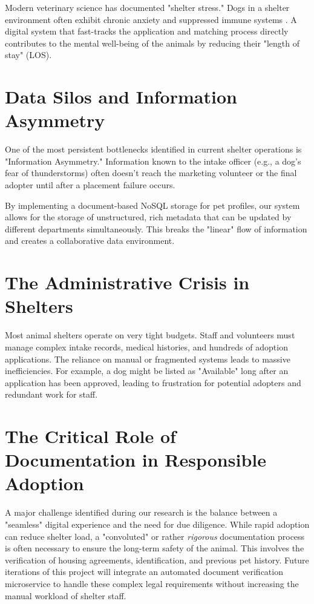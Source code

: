 Modern veterinary science has documented "shelter stress." Dogs in a shelter environment often exhibit chronic anxiety and suppressed immune systems \cite{shelter_stress_2022}. A digital system that fast-tracks the application and matching process directly contributes to the mental well-being of the animals by reducing their "length of stay" (LOS).

\section{Data Silos and Information Asymmetry}
One of the most persistent bottlenecks identified in current shelter operations is "Information Asymmetry." Information known to the intake officer (e.g., a dog's fear of thunderstorms) often doesn't reach the marketing volunteer or the final adopter until after a placement failure occurs.

By implementing a document-based NoSQL storage for pet profiles, our system allows for the storage of unstructured, rich metadata that can be updated by different departments simultaneously. This breaks the "linear" flow of information and creates a collaborative data environment.

\section{The Administrative Crisis in Shelters}

Most animal shelters operate on very tight budgets. Staff and volunteers must manage complex intake records, medical histories, and hundreds of adoption applications. The reliance on manual or fragmented systems leads to massive inefficiencies. For example, a dog might be listed as "Available" long after an application has been approved, leading to frustration for potential adopters and redundant work for staff.

\section{The Critical Role of Documentation in Responsible Adoption}
A major challenge identified during our research is the balance between a "seamless" digital experience and the need for due diligence. While rapid adoption can reduce shelter load, a "convoluted" or rather \textit{rigorous} documentation process is often necessary to ensure the long-term safety of the animal. This involves the verification of housing agreements, identification, and previous pet history. Future iterations of this project will integrate an automated document verification microservice to handle these complex legal requirements without increasing the manual workload of shelter staff.

